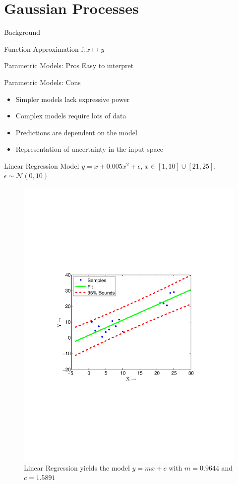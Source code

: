 \section{Gaussian Processes}
\begin{frame}{Background}
    \begin{block}{Function Approximation}
        $\mathrm{f}:x \mapsto y$
    \end{block}
    \pause
    \begin{block}{Parametric Models: Pros}
        Easy to interpret
    \end{block}
    \begin{block}{Parametric Models: Cons}
        \begin{itemize}
            \item Simpler models lack expressive power
            \item Complex models require lots of data
            \item Predictions are dependent on the model
            \item Representation of uncertainty in the input space
            \end{itemize}
    \end{block}
\end{frame}

\begin{frame}{Linear Regression Model}
    $y = x+0.005x^2+ \epsilon$, $x \in [1,10] \cup [21,25]$,  $\epsilon \sim \mathcal{N}(0,10)$ 
    \begin{figure}
        \centering
        \includegraphics[width=0.5\linewidth,trim=30mm 80mm 40mm 70mm,clip]{figures/linear_fit}
        \caption{Linear Regression yields the model $y=mx+c$ with $m = 0.9644$ and $c = 1.5891$ }
    \end{figure}
\end{frame}

